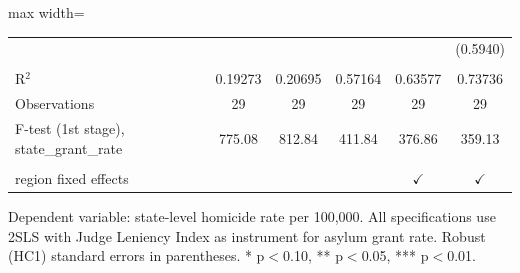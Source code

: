 \begin{table}[htbp]
\begin{adjustbox}{max width=\textwidth}
\begin{tabular}{lccccc}
                                               &                &                &                &                & (0.5940)\\   
       \\
      R$^2$                                    & 0.19273        & 0.20695        & 0.57164        & 0.63577        & 0.73736\\  
      Observations                             & 29             & 29             & 29             & 29             & 29\\  
      F-test (1st stage), state\_grant\_rate   & 775.08         & 812.84         & 411.84         & 376.86         & 359.13\\  
       \\
      region fixed effects                     &                &                &                & $\checkmark$   & $\checkmark$\\   
      \bottomrule
   \end{tabular}
   \end{adjustbox}

   \par \raggedright
   Dependent variable: state-level homicide rate per 100,000. All specifications use 2SLS with Judge Leniency Index as instrument for asylum grant rate. Robust (HC1) standard errors in parentheses. * p$<$0.10, ** p$<$0.05, *** p$<$0.01.
\end{table}

